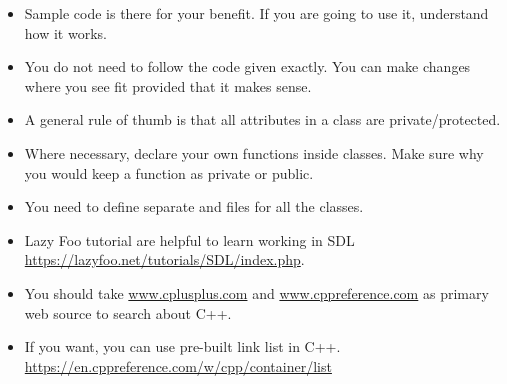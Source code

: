 \documentclass[a4paper,12pt]{article}
\begin{document}
	\begin{itemize}
		\item Sample code is there for your benefit. If you are going to use it, understand how it works. 
		\item You do not need to follow the code given exactly. You can make changes where you see fit provided that it makes sense.	\item A general rule of thumb is that all attributes in a class are private/protected.
		\item Where necessary, declare your own functions inside classes. Make sure why you would keep a function as private or public.	
		\item You need to define separate  and  files for all the classes.
		\item Lazy Foo tutorial are helpful to learn working in SDL \url{https://lazyfoo.net/tutorials/SDL/index.php}. 
		\item You should take \url{www.cplusplus.com} and \url{www.cppreference.com} as primary web source to search about C++.
		\item If you want, you can use pre-built link list in C++. \url{https://en.cppreference.com/w/cpp/container/list}
	\end{itemize}
	
\end{document}
